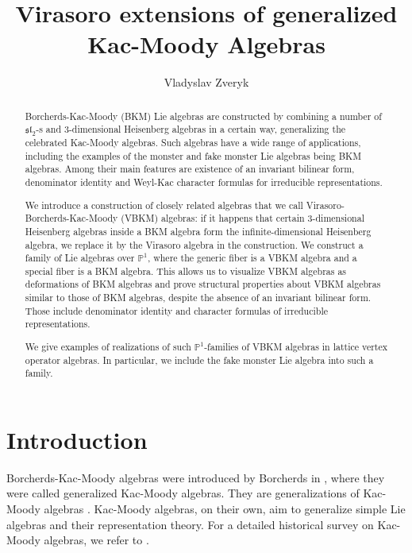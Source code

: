 \documentclass[11pt]{amsart}
\title[Virasoro extensions of generalized Kac-Moody Algebras]{Virasoro extensions of generalized Kac-Moody Algebras}
\author[Vladyslav Zveryk]{Vladyslav Zveryk}
\newcommand{\PP}{\mathbb{P}}
\renewcommand{\sl}{\mathfrak{sl}}
\numberwithin{equation}{section}
\theoremstyle{plain}
\theoremstyle{definition}
\begin{document}
\begin{abstract}
    Borcherds-Kac-Moody (BKM) Lie algebras are constructed by combining a number of $\sl_2$-s and $3$-dimensional Heisenberg algebras in a certain way, generalizing the celebrated Kac-Moody algebras. Such algebras have a wide range of applications, including the examples of the monster and fake monster Lie algebras being BKM algebras. Among their main features are existence of an invariant bilinear form, denominator identity and Weyl-Kac character formulas for irreducible representations.
    
    We introduce a construction of closely related algebras that we call Virasoro-Borcherds-Kac-Moody (VBKM) algebras: if it happens that certain $3$-dimensional Heisenberg algebras inside a BKM algebra form the infinite-dimensional Heisenberg algebra, we replace it by the Virasoro algebra in the construction. We construct a family of Lie algebras over $\PP^1$, where the generic fiber is a VBKM algebra and a special fiber is a BKM algebra. This allows us to visualize VBKM algebras as deformations of BKM algebras and prove structural properties about VBKM algebras similar to those of BKM algebras, despite the absence of an invariant bilinear form. Those include denominator identity and character formulas of irreducible representations.
    
    We give examples of realizations of such $\PP^1$-families of VBKM algebras in lattice vertex operator algebras. In particular, we include the fake monster Lie algebra into such a family. 
\end{abstract}

\maketitle
\tableofcontents

\section{Introduction}
Borcherds-Kac-Moody algebras were introduced by Borcherds in \cite{Bor88}, where they were called generalized Kac-Moody algebras. They are generalizations of Kac-Moody algebras \cite{Kac90}. Kac-Moody algebras, on their own, aim to generalize simple Lie algebras and their representation theory. For a detailed historical survey on Kac-Moody algebras, we refer to \cite{FT21}.
\end{document}
